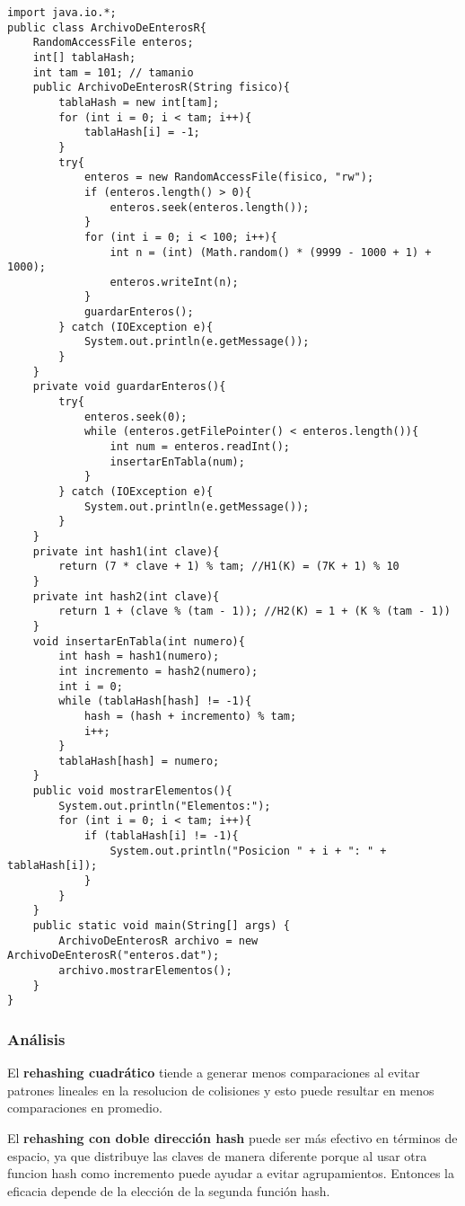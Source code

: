 \documentclass{scrreprt}
\begin{document}
\begin{lstlisting}[style=java]
import java.io.*;
public class ArchivoDeEnterosR{
    RandomAccessFile enteros;
    int[] tablaHash;
    int tam = 101; // tamanio
    public ArchivoDeEnterosR(String fisico){
        tablaHash = new int[tam];
        for (int i = 0; i < tam; i++){
            tablaHash[i] = -1;
        }
        try{
            enteros = new RandomAccessFile(fisico, "rw");
            if (enteros.length() > 0){
                enteros.seek(enteros.length());
            }
            for (int i = 0; i < 100; i++){
                int n = (int) (Math.random() * (9999 - 1000 + 1) + 1000);
                enteros.writeInt(n);
            }
            guardarEnteros();
        } catch (IOException e){
            System.out.println(e.getMessage());
        }
    }
    private void guardarEnteros(){
        try{
            enteros.seek(0);
            while (enteros.getFilePointer() < enteros.length()){
                int num = enteros.readInt();
                insertarEnTabla(num);
            }
        } catch (IOException e){
            System.out.println(e.getMessage());
        }
    }
    private int hash1(int clave){
        return (7 * clave + 1) % tam; //H1(K) = (7K + 1) % 10
    }
    private int hash2(int clave){
        return 1 + (clave % (tam - 1)); //H2(K) = 1 + (K % (tam - 1))
    }
    void insertarEnTabla(int numero){
        int hash = hash1(numero);
        int incremento = hash2(numero);
        int i = 0;
        while (tablaHash[hash] != -1){
            hash = (hash + incremento) % tam;
            i++;
        }
        tablaHash[hash] = numero;
    }
    public void mostrarElementos(){
        System.out.println("Elementos:");
        for (int i = 0; i < tam; i++){
            if (tablaHash[i] != -1){
                System.out.println("Posicion " + i + ": " + tablaHash[i]);
            }
        }
    }
    public static void main(String[] args) {
        ArchivoDeEnterosR archivo = new ArchivoDeEnterosR("enteros.dat");
        archivo.mostrarElementos();
    }
}
\end{lstlisting}
\subsubsection{Análisis}

El \textbf{rehashing cuadrático} tiende a generar menos comparaciones al evitar patrones lineales en la resolucion de colisiones y esto puede resultar en menos comparaciones en promedio.

El \textbf{rehashing con doble dirección hash} puede ser más efectivo en términos de espacio, ya que distribuye las claves de manera diferente porque al usar otra funcion hash como incremento puede ayudar a evitar agrupamientos. Entonces la eficacia depende de la elección de la segunda función hash.
\end{document}
